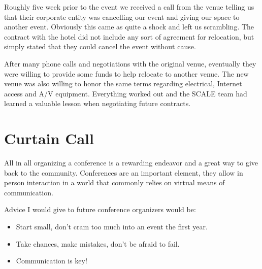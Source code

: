 Roughly five week prior to the event we received a call from the venue telling
us that their corporate entity was cancelling our event and giving our space to
another event.  Obviously this came as quite a shock and left us scrambling. 
The contract with the hotel did not include any sort of agreement for
relocation, but simply stated that they could cancel the event without cause.

After many phone calls and negotiations with the original venue, eventually they
were willing to provide some funds to help relocate to another venue.  The new
venue was also willing to honor the same terms regarding electrical, Internet
access and A/V equipment.  Everything worked out and the SCALE team had learned
a valuable lesson when negotiating future contracts.

\section*{Curtain Call}

All in all organizing a conference is a rewarding endeavor and a great way to
give back to the community.  Conferences are an important element, they allow in
person interaction in a world that commonly relies on virtual means of
communication.

Advice I would give to future conference organizers would be:
\begin{itemize}
 \item Start small, don’t cram too much into an event the first year.
 \item Take chances, make mistakes, don’t be afraid to fail.
 \item Communication is key!
\end{itemize}